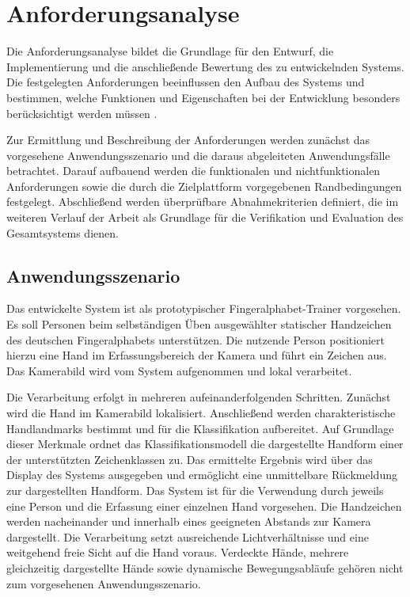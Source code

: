\chapter{Anforderungsanalyse}\label{ch:anforderungen}

Die Anforderungsanalyse bildet die Grundlage für den Entwurf, die Implementierung und die anschließende Bewertung des zu entwickelnden Systems. Die festgelegten Anforderungen beeinflussen den Aufbau des Systems und bestimmen, welche Funktionen und Eigenschaften bei der Entwicklung besonders berücksichtigt werden müssen \cite[S. 53 ff.]{kleukerAnforderungsanalyse2025}.

Zur Ermittlung und Beschreibung der Anforderungen werden zunächst das vorgesehene Anwendungsszenario und die daraus abgeleiteten Anwendungsfälle betrachtet. Darauf aufbauend werden die funktionalen und nichtfunktionalen Anforderungen sowie die durch die Zielplattform vorgegebenen Randbedingungen festgelegt. Abschließend werden überprüfbare \linebreak Abnahmekriterien definiert, die im weiteren Verlauf der Arbeit als Grundlage für die Verifikation und Evaluation des Gesamtsystems dienen.

\section{Anwendungsszenario}\label{sec:anwendungsszenario}
Das entwickelte System ist als prototypischer Fingeralphabet-Trainer vorgesehen. Es soll Personen beim selbständigen Üben ausgewählter statischer Handzeichen des deutschen Fingeralphabets unterstützen. Die nutzende Person positioniert hierzu eine Hand im Erfassungsbereich der Kamera und führt ein Zeichen aus. Das Kamerabild wird vom System aufgenommen und lokal verarbeitet.

Die Verarbeitung erfolgt in mehreren aufeinanderfolgenden Schritten. Zunächst wird die Hand im Kamerabild lokalisiert. Anschließend werden charakteristische Handlandmarks bestimmt und für die Klassifikation aufbereitet. Auf Grundlage dieser Merkmale ordnet das Klassifikationsmodell die dargestellte Handform einer der unterstützten Zeichenklassen zu. Das ermittelte Ergebnis wird über das Display des Systems ausgegeben und ermöglicht eine unmittelbare Rückmeldung zur dargestellten Handform. Das System ist für die Verwendung durch jeweils eine Person und die Erfassung einer einzelnen Hand vorgesehen. Die Handzeichen werden nacheinander und innerhalb eines geeigneten Abstands zur Kamera dargestellt. Die Verarbeitung setzt ausreichende Lichtverhältnisse und eine weitgehend freie Sicht auf die Hand voraus. Verdeckte Hände, mehrere gleichzeitig dargestellte Hände sowie dynamische Bewegungsabläufe gehören nicht zum vorgesehenen Anwendungsszenario.

